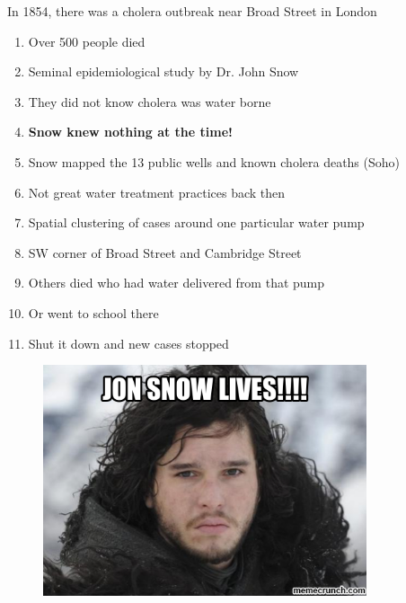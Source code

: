 \documentclass[aspectratio=1610,pdftex,dvipsnames,compress,xcolor={dvipsnames}]{beamer}
\begin{document}
\addtocounter{framenumber}{-2}
\begin{frame}{In 1854, there was a cholera outbreak near Broad Street in London}
    \begin{enumerate}[series=outerlist,topsep=0pt,itemsep=3pt,leftmargin=*,label=(\arabic*)]
        \item[]Over 500 people died
        \item[]Seminal epidemiological study by Dr. John Snow
        \item[]They did not know cholera was water borne
            \vspace{0.10in}
        \item[]\textbf{Snow knew nothing at the time!}
            \vspace{0.10in}
        \item[]Snow mapped the 13 public wells and known cholera deaths (Soho)
        \item[]Not great water treatment practices back then
        \item[]Spatial clustering of cases around one particular water pump  
        \item[]SW corner of Broad Street and Cambridge Street  
        \item[]Others died who had water delivered from that pump  
        \item[]Or went to school there
            \vspace{0.10in}
        \item[]Shut it down and new cases stopped
    \end{enumerate}
\end{frame}


\begin{frame}{}
    \begin{figure}
        \centering
        \includegraphics[width=0.85\textwidth]{snow.png}
    \end{figure}
\end{frame}
\end{document}
